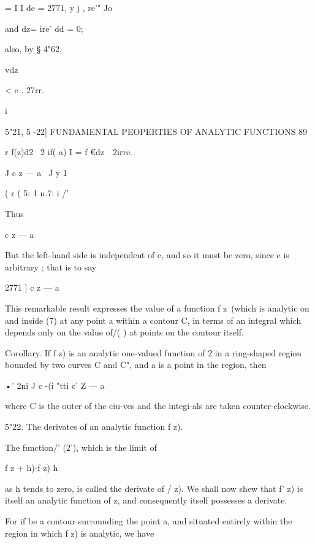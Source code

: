 {{= I I de = 2771, 
y  j , re'" Jo 



and dz= ire' dd = 0; 



also, by § 4"62, 



vdz 



< e . 27rr. 



i 



5"21, 5 -22] FUNDAMENTAL PEOPERTIES OF ANALYTIC FUNCTIONS 89 

r f(z)d2 \  2 if( a) I = f €dz\ \   2irre. 

J c z — a \ J y 1 



( r ( 5: 1 n.7: i /' 

Thus 

c z — a 



But the left-hand side is independent of e, and so it must be zero, since e 
is arbitrary ; that is to say 



    2771 ] c z — a 



This remarkable result expresses the value of a function f z\ (which is 
analytic on and inside (7) at any point a within a contour C, in terms of an 
integral which depends only on the value of/( ) at points on the contour 
itself. 

Corollary. If f z) is an analytic one-valued function of 2 in a ring-shaped region 
bounded by two curves C and C", and a is a point in the region, then 



•' 2ni J c  -(i "tti   c' Z — a 



where C is the outer of the ciu-ves and the integi-als are taken counter-clockwise. 

5"22. The derivates of an analytic function f z). 

The function/' (2'), which is the limit of 

f z + h)-f z) 
h 

as h tends to zero, is called the derivate of /  z). We shall now shew that 
f' z) is itself an analytic function of z, and consequently itself possesses a 
derivate. 

For if be a contour surrounding the point a, and situated entirely 
within the region in which f z) is analytic, we have 

}}
